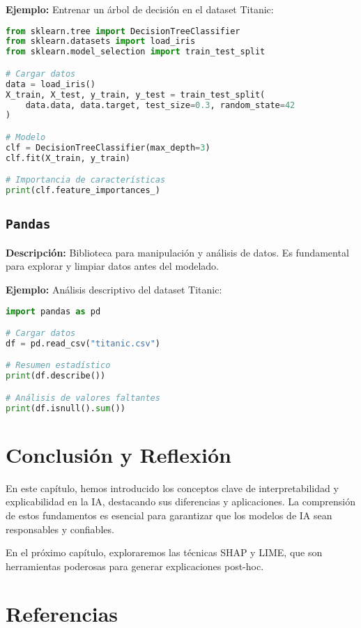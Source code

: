 \begin{refsection}
\textbf{Ejemplo:} Entrenar un árbol de decisión en el dataset Titanic:
\begin{lstlisting}[language=Python]
from sklearn.tree import DecisionTreeClassifier
from sklearn.datasets import load_iris
from sklearn.model_selection import train_test_split

# Cargar datos
data = load_iris()
X_train, X_test, y_train, y_test = train_test_split(
    data.data, data.target, test_size=0.3, random_state=42
)

# Modelo
clf = DecisionTreeClassifier(max_depth=3)
clf.fit(X_train, y_train)

# Importancia de características
print(clf.feature_importances_)
\end{lstlisting}

\subsection{\texttt{Pandas}}
\textbf{Descripción:} Biblioteca para manipulación y análisis de datos. Es fundamental para explorar y limpiar datos antes del modelado.

\textbf{Ejemplo:} Análisis descriptivo del dataset Titanic:
\begin{lstlisting}[language=Python]
import pandas as pd

# Cargar datos
df = pd.read_csv("titanic.csv")

# Resumen estadístico
print(df.describe())

# Análisis de valores faltantes
print(df.isnull().sum())
\end{lstlisting}

\section{Conclusión y Reflexión}
En este capítulo, hemos introducido los conceptos clave de interpretabilidad y explicabilidad en la IA, destacando sus diferencias y aplicaciones. La comprensión de estos fundamentos es esencial para garantizar que los modelos de IA sean responsables y confiables. 

En el próximo capítulo, exploraremos las técnicas SHAP y LIME, que son herramientas poderosas para generar explicaciones post-hoc.

\section*{Referencias}
\printbibliography[heading=none]
\end{refsection}

